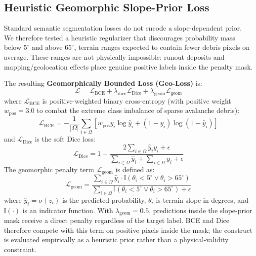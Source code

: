 \subsection{Heuristic Geomorphic Slope-Prior Loss}
\label{sec:method:loss}

Standard semantic segmentation losses do not encode a slope-dependent prior. We therefore tested a heuristic regularizer that discourages probability mass below $5^\circ$ and above $65^\circ$, terrain ranges expected to contain fewer debris pixels on average. These ranges are not physically impossible: runout deposits and mapping/geolocation effects place genuine positive labels inside the penalty mask.

The resulting \textbf{Geomorphically Bounded Loss (Geo-Loss)} is:
\begin{equation}
\mathcal{L} = \mathcal{L}_{\text{BCE}} + \lambda_{\text{dice}} \mathcal{L}_{\text{Dice}} + \lambda_{\text{geom}} \mathcal{L}_{\text{geom}} \label{eq:total_loss}
\end{equation}
where $\mathcal{L}_{\text{BCE}}$ is positive-weighted binary cross-entropy (with positive weight $w_{\text{pos}} = 3.0$ to combat the extreme class imbalance of sparse avalanche debris):
\begin{equation}
\mathcal{L}_{\text{BCE}} = -\frac{1}{|\Omega|} \sum_{i \in \Omega} \left[ w_{\text{pos}} y_i \log \hat{y}_i + (1 - y_i) \log (1 - \hat{y}_i) \right]
\end{equation}
and $\mathcal{L}_{\text{Dice}}$ is the soft Dice loss:
\begin{equation}
\mathcal{L}_{\text{Dice}} = 1 - \frac{2 \sum_{i \in \Omega} \hat{y}_i y_i + \epsilon}{\sum_{i \in \Omega} \hat{y}_i + \sum_{i \in \Omega} y_i + \epsilon}
\end{equation}
The geomorphic penalty term $\mathcal{L}_{\text{geom}}$ is defined as:
\begin{equation}
\mathcal{L}_{\text{geom}} = \frac{\sum_{i \in \Omega} \hat{y}_i \cdot \mathbb{I}(\theta_i < 5^\circ \lor \theta_i > 65^\circ)}{\sum_{i \in \Omega} \mathbb{I}(\theta_i < 5^\circ \lor \theta_i > 65^\circ) + \epsilon} \label{eq:geo_loss}
\end{equation}
where $\hat{y}_i = \sigma(z_i)$ is the predicted probability, $\theta_i$ is terrain slope in degrees, and $\mathbb{I}(\cdot)$ is an indicator function. With $\lambda_{\text{geom}} = 0.5$, predictions inside the slope-prior mask receive a direct penalty regardless of the target label. BCE and Dice therefore compete with this term on positive pixels inside the mask; the construct is evaluated empirically as a heuristic prior rather than a physical-validity constraint.

